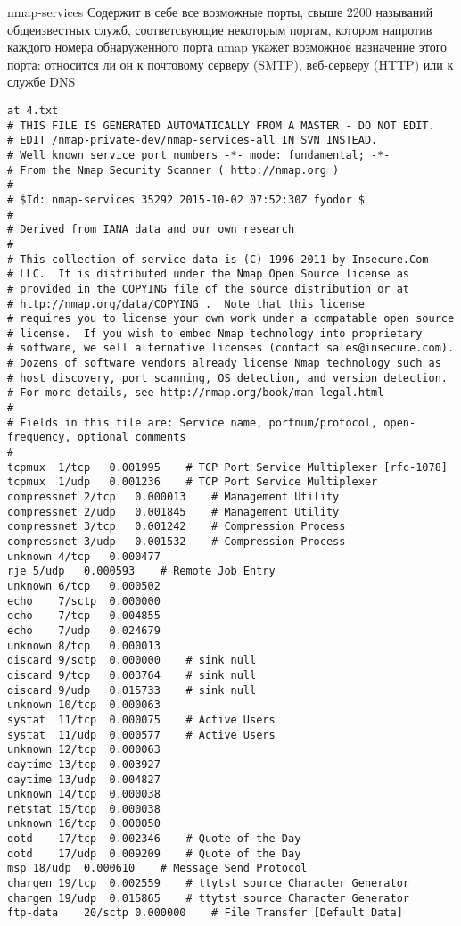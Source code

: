 \documentclass[12pt,a4paper]{report}
\begin{document}
nmap-services
Содержит в себе все возможные порты, свыше 2200 называний общеизвестных служб, соответсвующие некоторым портам, котором
напротив каждого номера обнаруженного порта nmap укажет возможное назначение этого порта: относится ли он к почтовому серверу (SMTP), веб-серверу (HTTP) или к службе DNS
\begin{verbatim}
at 4.txt 
# THIS FILE IS GENERATED AUTOMATICALLY FROM A MASTER - DO NOT EDIT.
# EDIT /nmap-private-dev/nmap-services-all IN SVN INSTEAD.
# Well known service port numbers -*- mode: fundamental; -*-
# From the Nmap Security Scanner ( http://nmap.org )
#
# $Id: nmap-services 35292 2015-10-02 07:52:30Z fyodor $
#
# Derived from IANA data and our own research
# 
# This collection of service data is (C) 1996-2011 by Insecure.Com
# LLC.  It is distributed under the Nmap Open Source license as
# provided in the COPYING file of the source distribution or at
# http://nmap.org/data/COPYING .  Note that this license
# requires you to license your own work under a compatable open source
# license.  If you wish to embed Nmap technology into proprietary
# software, we sell alternative licenses (contact sales@insecure.com).
# Dozens of software vendors already license Nmap technology such as
# host discovery, port scanning, OS detection, and version detection.
# For more details, see http://nmap.org/book/man-legal.html
#
# Fields in this file are: Service name, portnum/protocol, open-frequency, optional comments
#
tcpmux	1/tcp	0.001995	# TCP Port Service Multiplexer [rfc-1078]
tcpmux	1/udp	0.001236	# TCP Port Service Multiplexer
compressnet	2/tcp	0.000013	# Management Utility
compressnet	2/udp	0.001845	# Management Utility
compressnet	3/tcp	0.001242	# Compression Process
compressnet	3/udp	0.001532	# Compression Process
unknown	4/tcp	0.000477
rje	5/udp	0.000593	# Remote Job Entry
unknown	6/tcp	0.000502
echo	7/sctp	0.000000
echo	7/tcp	0.004855
echo	7/udp	0.024679
unknown	8/tcp	0.000013
discard	9/sctp	0.000000	# sink null
discard	9/tcp	0.003764	# sink null
discard	9/udp	0.015733	# sink null
unknown	10/tcp	0.000063
systat	11/tcp	0.000075	# Active Users
systat	11/udp	0.000577	# Active Users
unknown	12/tcp	0.000063
daytime	13/tcp	0.003927
daytime	13/udp	0.004827
unknown	14/tcp	0.000038
netstat	15/tcp	0.000038
unknown	16/tcp	0.000050
qotd	17/tcp	0.002346	# Quote of the Day
qotd	17/udp	0.009209	# Quote of the Day
msp	18/udp	0.000610	# Message Send Protocol
chargen	19/tcp	0.002559	# ttytst source Character Generator
chargen	19/udp	0.015865	# ttytst source Character Generator
ftp-data	20/sctp	0.000000	# File Transfer [Default Data]

\end{verbatim}
\end{document}
